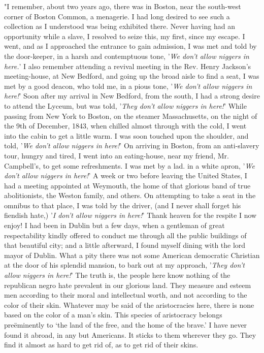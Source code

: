"I remember, about two years ago, there was in Boston, near the
south-west corner of Boston Common, a menagerie. I had long desired to
see such a collection as I understood was being exhibited there. Never
having had an opportunity while a slave, I resolved to seize this, my
first, since my escape. I went, and as I approached the entrance to gain
admission, I was met and told by the door-keeper, in a harsh and
contemptuous tone, {'}\emph{We don't allow niggers in here.}{'} I also
remember attending a revival meeting in the Rev. Henry Jackson's
meeting-house, at New Bedford, and going up the broad aisle to find a
seat, I was met by a good deacon, who told me, in a pious tone,
{'}\emph{We don't allow niggers in here!}{'} Soon after my arrival in
New Bedford, from the south, I had a strong
{\protect\hypertarget{372}{}{}}desire to attend the Lyceum, but was
told, {'}\emph{They don't allow niggers in here!}{'} While passing from
New York to Boston, on the steamer Massachusetts, on the night of the
9th of December, 1843, when chilled almost through with the cold, I went
into the cabin to get a little warm. I was soon touched upon the
shoulder, and told, {'}\emph{We don't allow niggers in here!}{'} On
arriving in Boston, from an anti-slavery tour, hungry and tired, I went
into an eating-house, near my friend, Mr. Campbell's, to get some
refreshments. I was met by a lad. in a white apron, {'}\emph{We don't
allow niggers in here!}{'} A week or two before leaving the United
States, I had a meeting appointed at Weymouth, the home of that glorious
band of true abolitionists, the Weston family, and others. On attempting
to take a seat in the omnibus to that place, I was told by the driver,
(and I never shall forget his fiendish hate,) {'}\emph{I don't allow
niggers in here!}{'} Thank heaven for the respite I now enjoy! I had
been in Dublin but a few days, when a gentleman of great respectability
kindly offered to conduct me through all the public buildings of that
beautiful city; and a little afterward, I found myself dining with the
lord mayor of Dublin. What a pity there was not some American democratic
Christian at the door of his splendid mansion, to bark out at my
approach, {'}\emph{They don't allow niggers in here!}{'} The truth is,
the people here know nothing of the republican negro hate prevalent in
our glorious land. They measure and esteem men according to their moral
and intellectual worth, and not according to the color of their skin.
Whatever may be said of the aristocracies here, there is none based on
the color of a man's skin. This species of aristocracy belongs
preëminently to `the land of the free, and the home of the brave.' I
have never found it abroad, in any but Americans. It sticks to them
wherever they go. They find it almost as hard to get rid of, as to get
rid of their skins.

